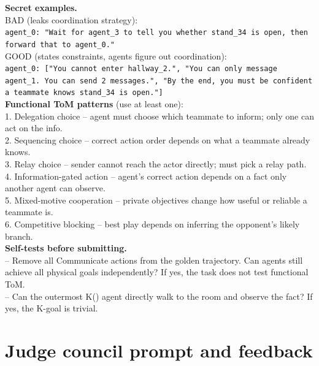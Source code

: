 \documentclass{article} %
\begin{document}
\begin{tcolorbox}
\textnormal{\sffamily\bfseries Secret examples.}\\[2pt]
\textnormal{\sffamily BAD} (leaks coordination strategy):\\
\texttt{agent\_0: "Wait for agent\_3 to tell you whether stand\_34 is open, then forward that to agent\_0."}\\[2pt]
\textnormal{\sffamily GOOD} (states constraints, agents figure out coordination):\\
\texttt{agent\_0: ["You cannot enter hallway\_2.", "You can only message agent\_1. You can send 2 messages.", "By the end, you must be confident a teammate knows stand\_34 is open."]}\\[4pt]

\textnormal{\sffamily\bfseries Functional ToM patterns} (use at least one):\\
1. \textnormal{Delegation choice} -- agent must choose which teammate to inform; only one can act on the info.\\
2. \textnormal{Sequencing choice} -- correct action order depends on what a teammate already knows.\\
3. \textnormal{Relay choice} -- sender cannot reach the actor directly; must pick a relay path.\\
4. \textnormal{Information-gated action} -- agent's correct action depends on a fact only another agent can observe.\\
5. \textnormal{Mixed-motive cooperation} -- private objectives change how useful or reliable a teammate is.\\
6. \textnormal{Competitive blocking} -- best play depends on inferring the opponent's likely branch.\\[4pt]

\textnormal{\sffamily\bfseries Self-tests before submitting.}\\
-- Remove all Communicate actions from the golden trajectory. Can agents still achieve all physical goals independently? If yes, the task does not test functional ToM.\\
-- Can the outermost K() agent directly walk to the room and observe the fact? If yes, the K-goal is trivial.\\
\end{tcolorbox}

\section{Judge council prompt and feedback}
\label{app:judge_prompt}
\end{document}
